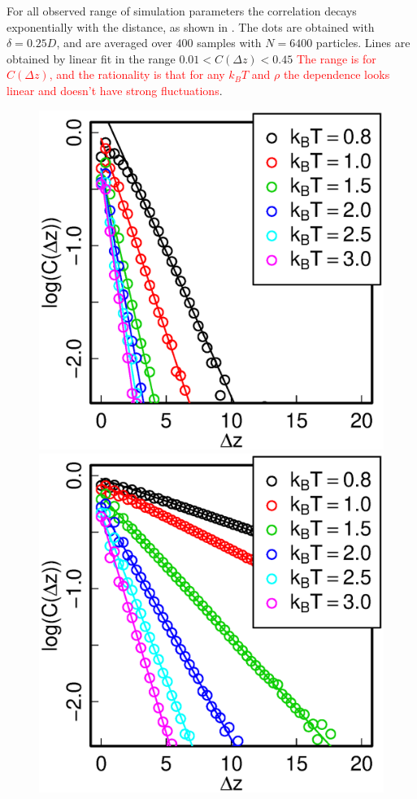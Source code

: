 For all observed range of simulation parameters the correlation decays exponentially with the distance, as shown in . The dots are obtained with $\delta = 0.25D$, and are averaged over $400$ samples with $N = 6400$ particles. Lines are obtained by linear fit in the range $0.01 < C(\Delta z) < 0.45$ \textcolor{red}{The range is for $C(\Delta z)$, and the rationality is that for any $k_BT$ and $\rho$ the dependence looks linear and doesn't have strong fluctuations}.
\begin{figure}[t]
\centering
\begin{minipage}[c]{0.32\textwidth}
	\includegraphics[width=\textwidth]{Images/distCor_25}
\end{minipage}
\begin{minipage}[c]{0.32\textwidth}
	\includegraphics[width=\textwidth]{Images/distCor_75}

\end{minipage}
\end{figure}
